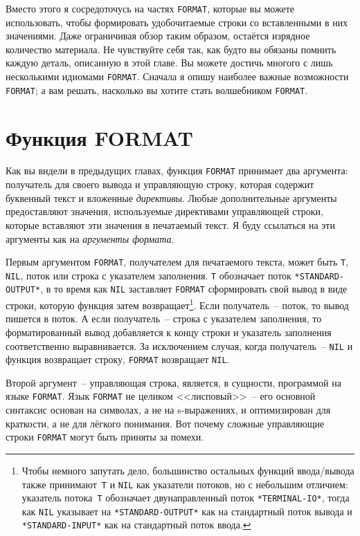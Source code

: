 Вместо этого я сосредоточусь на частях \lstinline{FORMAT}, которые вы можете использовать,
чтобы формировать удобочитаемые строки со вставленными в них значениями. Даже ограничивая
обзор таким образом, остаётся изрядное количество материала. Не чувствуйте себя так, как
будто вы обязаны помнить каждую деталь, описанную в этой главе. Вы можете достичь многого
с лишь несколькими идиомами \lstinline{FORMAT}. Сначала я опишу наиболее важные возможности
\lstinline{FORMAT}; а вам решать, насколько вы хотите стать волшебником \lstinline{FORMAT}.
 
\section{Функция FORMAT}

Как вы видели в предыдущих главах, функция \lstinline{FORMAT} принимает два аргумента:
получатель для своего вывода и управляющую строку, которая содержит буквенный текст и
вложенные \textit{директивы}. Любые дополнительные аргументы предоставляют значения,
используемые директивами управляющей строки, которые вставляют эти значения в печатаемый
текст. Я буду ссылаться на эти аргументы как на \textit{аргументы формата}.

Первым аргументом \lstinline{FORMAT}, получателем для печатаемого текста, может быть
\lstinline{T}, \lstinline{NIL}, поток или строка с указателем заполнения. \lstinline{Т}
обозначает поток \lstinline{*STANDARD-OUTPUT*}, в то время как \lstinline{NIL} заставляет
\lstinline{FORMAT} сформировать свой вывод в виде строки, которую функция затем
возвращает\footnote{Чтобы немного запутать дело, большинство остальных функций
  ввода/вывода также принимают~\lstinline{T} и \lstinline{NIL} как указатели потоков, но с
  небольшим отличием: указатель потока~\lstinline{Т} обозначает двунаправленный поток
  \lstinline{*TERMINAL-IO*}, тогда как \lstinline{NIL} указывает на
  \lstinline{*STANDARD-OUTPUT*} как на стандартный поток вывода и
  \lstinline{*STANDARD-INPUT*} как на стандартный поток ввода.}.  Если получатель~--
поток, то вывод пишется в поток. А если получатель~-- строка с указателем заполнения, то
форматированный вывод добавляется к концу строки и указатель заполнения соответственно
выравнивается. За исключением случая, когда получатель~-- \lstinline{NIL} и функция
возвращает строку, \lstinline{FORMAT} возвращает \lstinline{NIL}.

Второй аргумент~-- управляющая строка, является, в сущности, программой на языке
\lstinline{FORMAT}. Язык \lstinline{FORMAT} не целиком <<лисповый>>~-- его основной синтаксис основан
на символах, а не на s-выражениях, и оптимизирован для краткости, а не для лёгкого
понимания. Вот почему сложные управляющие строки \lstinline{FORMAT} могут быть приняты за
помехи.

